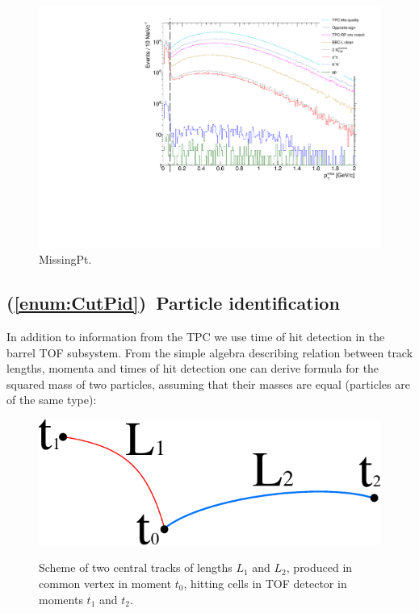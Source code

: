 \begin{figure}[ht!]
\centering%
\includegraphics[width=0.633\linewidth,page=1]{graphics/eventSelection/MissingPt.pdf}%
\caption{MissingPt.}\label{fig:MissingPt}%
\end{figure}


\subsection{(\ref{enum:CutPid})~Particle identification}

In addition to information from the TPC we use time of hit detection in the barrel TOF subsystem. From the simple algebra describing relation between track lengths, momenta and times of hit detection one can derive formula for the squared mass of two particles, assuming that their masses are equal (particles are of the same type):

\begin{figure}[ht!]
\centering%
\parbox{0.29\textwidth}{%
  \centering%
  \includegraphics[width=\linewidth]{graphics/eventSelection/TofScheme.pdf}\label{fig:tofScheme}
}%
\quad\quad%
\parbox{0.655\textwidth}{%
    \caption[Scheme of two central tracks with common vertex, hitting cells in TOF detector.]{Scheme of two central tracks of lengths $L_{1}$ and $L_{2}$, produced in common vertex in moment $t_{0}$, hitting cells in TOF detector in moments $t_{1}$ and $t_{2}$.}
}%

\end{figure}

